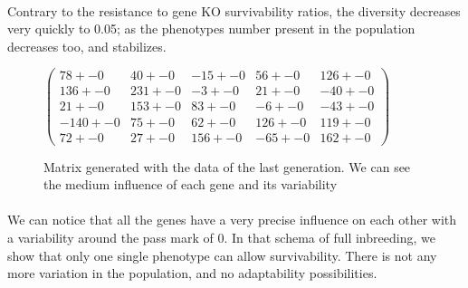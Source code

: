 \documentclass[]{report} %
\begin{document}
   \paragraph*{}
   Contrary to the resistance to gene KO survivability ratios, the diversity decreases very quickly to 0.05; as the phenotypes number present in the population decreases too, and stabilizes.
   

    \begin{figure}[H] 
            \centering
            \small
    $
          \begin{pmatrix}
                78 +- 0 & 40 +- 0 & -15 +- 0 & 56 +- 0 & 126 +- 0 \\
                136 +- 0 & 231 +- 0 & -3 +- 0 & 21 +- 0 & -40 +- 0 \\
                21 +- 0 & 153 +- 0 & 83 +- 0 & -6 +- 0 & -43 +- 0 \\
                -140 +- 0 & 75 +- 0 & 62 +- 0 & 126 +- 0 & 119 +- 0 \\
                72 +- 0 & 27 +- 0 & 156 +- 0 & -65 +- 0 & 162 +- 0 
           \end{pmatrix}
    $
            \caption{\footnotesize Matrix generated with the data of the last generation. We can see the medium influence of each gene and its variability}
            \label{mat:ps20xg200xprt20xmr1-10-4}
    \end{figure}
    \paragraph*{}
    We can notice that all the genes have a very precise influence on each other with a variability around the pass mark of 0. In that schema of full inbreeding, we show that only one single phenotype can allow survivability. There is not any more variation in the population, and no adaptability possibilities.


\end{document}
